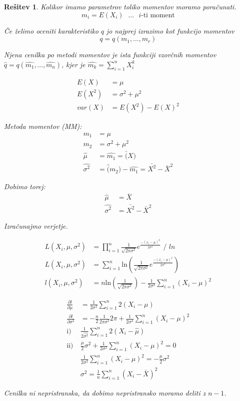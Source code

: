 \documentclass{homework}
\newtheorem{solution}{Rešitev}
\begin{document}
\begin{solution}
Kolikor imamo parametrov toliko momentov moramo poračunati. 
$$m_i = E(X_i) \text{  $\dots$ $i$-ti moment}$$

Če želimo oceniti karakteristiko $q$ jo najprej izrazimo kot funkcijo momentov 
$$q = q(m_1, \dots, m_r)$$

Njena cenilka po metodi momentov je ista funkciji vzorčnih momentov $\hat{q} = q(\hat{m_1}, \dots, \hat{m_n})$, kjer je $\hat{m_k} = \sum_{i = 1}^{n} X^k_i$

\begin{align*}
E(X) & = \mu \\
E(X^2) & = \sigma^2 + \mu^2 \\
var(X) & = E(X^2) - E(X)^2 
\end{align*}

Metoda momentov (MM):
\begin{align*}
  m_1 & = \mu\\ 
  m_2 & = \sigma^2 + \mu^2\\ 
  \hat{\mu} & = \hat{m_1} = \bar(X)\\ 
  \hat{\sigma^2} & = \hat(m_2) - \hat{m_1} = \bar{X^2} - \bar{X}^2   
\end{align*}

Dobimo torej:
\begin{align*}
  \hat{\mu} & = \bar{X} \\
  \hat{\sigma^2} & = \bar{X^2} - \bar{X}^2 
\end{align*}

Izračunajmo verjetje.

\begin{align*}
  L(X_i, \mu, \sigma^2) & = \prod_{i=1}^n \frac{1}{\sqrt{2\pi \sigma^2}}e^{\frac{-(x_i-\mu)^2}{2\sigma^2}} \text{ / } ln\\
  L(X_i, \mu, \sigma^2) & = \sum_{i=1}^n \text{ln}(\frac{1}{\sqrt{2\pi \sigma^2}}e^{\frac{-(x_i-\mu)^2}{2\sigma^2}}) \\
  l(X_i, \mu, \sigma^2) & = n \text{ln}(\frac{1}{\sqrt{2\pi \sigma^2}}) - \frac{1}{2\sigma^2} \sum_{i=1}^{n}(X_i-\mu)^2 
\end{align*}

\begin{align*}
  \frac{\partial l}{\partial \mu} & = \frac{1}{2\sigma^2} \sum_{i=1}^{n} 2(X_i - \mu) \\
  \frac{\partial l}{\partial \sigma^2} & = - \frac{n}{2} \frac{1}{2\pi \sigma^2} 2\pi + \frac{1}{2 \sigma^4} \sum_{i=1}^n (X_i - \mu)^2 \\
  \text{i) } & \frac{1}{2 \hat{\sigma^2}} \sum_{i=1}^n 2(X_i - \hat{\mu}) \\
  \text{ii)} & \frac{\mu}{2}\sigma^2 + \frac{1}{2\sigma^2} \sum_{i=1}^n (X_i - \mu)^2 = 0 \\
  & \frac{1}{2\sigma^2} \sum_{i=1}^n (X_i - \mu)^2 = - \frac{\mu}{2}\sigma^2 \\
  & \sigma^2 = \frac{1}{n} \sum_{i=1}^n (X_i - \bar{X})^2
\end{align*}

Cenilka ni nepristranska, da dobimo nepristransko moramo deliti z $n-1$.

\end{solution}
\end{document}
